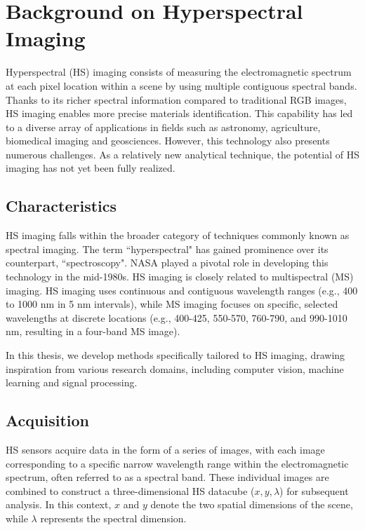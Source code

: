 \section{Background on Hyperspectral Imaging}
\label{sec:HS}

Hyperspectral (HS) imaging consists of measuring the electromagnetic spectrum at each pixel location within a scene by using multiple contiguous spectral bands.
Thanks to its richer spectral information compared to traditional RGB images, HS imaging enables more precise materials identification.
This capability has led to a diverse array of applications in fields such as astronomy, agriculture, biomedical imaging and geosciences.
However, this technology also presents numerous challenges.
As a relatively new analytical technique, the potential of HS imaging has not yet been fully realized. 

\subsection{Characteristics}

HS imaging falls within the broader category of techniques commonly known as spectral imaging.
The term ``hyperspectral" has gained prominence over its counterpart, ``spectroscopy".
NASA played a pivotal role in developing this technology in the mid-1980s.
HS imaging is closely related to multispectral (MS) imaging.
HS imaging uses continuous and contiguous wavelength ranges (e.g., 400 to 1000 nm in 5 nm intervals), while MS imaging focuses on specific, selected wavelengths at discrete locations (e.g., 400-425, 550-570, 760-790, and 990-1010 nm, resulting in a four-band MS image).

In this thesis, we develop methods specifically tailored to HS imaging, drawing inspiration from various research domains, including computer vision, machine learning and signal processing.

\subsection{Acquisition}

HS sensors acquire data in the form of a series of images, with each image corresponding to a specific narrow wavelength range within the electromagnetic spectrum, often referred to as a spectral band.
These individual images are combined to construct a three-dimensional HS datacube ($x, y, \lambda$) for subsequent analysis.
In this context, $x$ and $y$ denote the two spatial dimensions of the scene, while $\lambda$ represents the spectral dimension.

